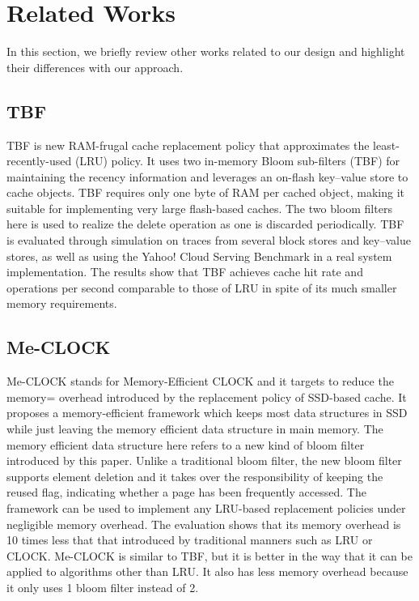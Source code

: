 \documentclass[journal,10.5pt,onecolumn]{IEEEtran}
\begin{document}
\section{Related Works}
In this section, we briefly review other works related to our design and highlight their differences with our approach.

\subsection{TBF}
TBF \cite{b2} is new RAM-frugal cache replacement policy that approximates the least-recently-used (LRU) policy. It uses two in-memory Bloom sub-filters (TBF) for maintaining the recency information and leverages an on-flash key–value store to cache objects. TBF requires only one byte of RAM per cached object, making it suitable for implementing very large flash-based caches. The two bloom filters here is used to realize the delete operation as one is discarded periodically. TBF is evaluated through simulation on traces from several block stores and key–value stores, as well as using the Yahoo! Cloud Serving Benchmark in a real system implementation. The results show that TBF achieves cache hit rate and operations per second comparable to those of LRU in spite of its much smaller memory requirements.

\subsection{Me-CLOCK}
Me-CLOCK \cite{b3} stands for Memory-Efficient CLOCK and it targets to reduce the memory= overhead introduced by the replacement policy of SSD-based cache. It proposes a memory-efficient framework which keeps most data structures in SSD while just leaving the memory efficient data structure in main memory.
The memory efficient data structure here refers to a new kind of bloom filter introduced by this paper. Unlike a traditional bloom filter, the new bloom filter supports element deletion and it takes over the responsibility of keeping the reused flag, indicating whether a page has been frequently accessed. The framework can be used to implement any LRU-based replacement policies under negligible memory overhead. The evaluation shows that its memory overhead is 10 times less that that introduced by traditional manners such as LRU or CLOCK.
Me-CLOCK is similar to TBF, but it is better in the way that it can be applied to algorithms other than LRU. It also has less memory overhead because it only uses 1 bloom filter instead of 2.
\end{document}
